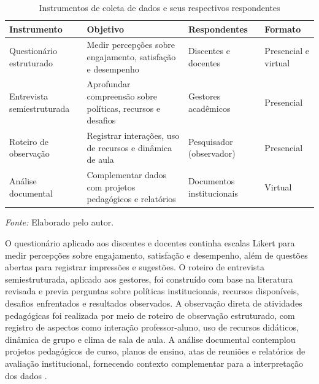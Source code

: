 \begin{table}[htbp]
    \centering
    \caption{Instrumentos de coleta de dados e seus respectivos respondentes}
    \label{tab:instrumentos_coleta}
    \small
    \begin{tabular}{p{3cm} p{5cm} p{2.5cm} p{3cm}}
        \toprule
        \textbf{Instrumento} & \textbf{Objetivo} & \textbf{Respondentes} & \textbf{Formato} \\
        \midrule
        Questionário estruturado & Medir percepções sobre engajamento, satisfação e desempenho & Discentes e docentes & Presencial e virtual \\
        \addlinespace
        Entrevista semiestruturada & Aprofundar compreensão sobre políticas, recursos e desafios & Gestores acadêmicos & Presencial \\
        \addlinespace
        Roteiro de observação & Registrar interações, uso de recursos e dinâmica de aula & Pesquisador (observador) & Presencial \\
        \addlinespace
        Análise documental & Complementar dados com projetos pedagógicos e relatórios & Documentos institucionais & Virtual \\
        \bottomrule
    \end{tabular}
    \par\medskip
    \footnotesize{\textit{Fonte:} Elaborado pelo autor.}
\end{table}

O questionário aplicado aos discentes e docentes continha escalas Likert para medir percepções sobre engajamento, satisfação e desempenho, além de questões abertas para registrar impressões e sugestões. O roteiro de entrevista semiestruturada, aplicado aos gestores, foi construído com base na literatura revisada e previa perguntas sobre políticas institucionais, recursos disponíveis, desafios enfrentados e resultados observados. A observação direta de atividades pedagógicas foi realizada por meio de roteiro de observação estruturado, com registro de aspectos como interação professor-aluno, uso de recursos didáticos, dinâmica de grupo e clima de sala de aula. A análise documental contemplou projetos pedagógicos de curso, planos de ensino, atas de reuniões e relatórios de avaliação institucional, fornecendo contexto complementar para a interpretação dos dados \cite{BARDIN2016}.


